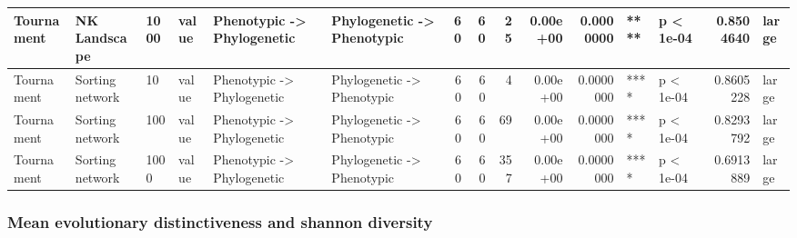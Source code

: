 \documentclass[]{book}
\begin{document}
\begin{table}
\begin{tabular}[t]{l|l|l|l|l|l|r|r|r|r|r|l|l|r|l}
\hline
Tournament & NK Landscape & 1000 & value & Phenotypic
    ->
Phylogenetic & Phylogenetic
    ->
Phenotypic & 60 & 60 & 25 & 0.00e+00 & 0.0000000 & **** & p < 1e-04 & 0.8504640 & large\\
\hline
Tournament & Sorting network & 10 & value & Phenotypic
    ->
Phylogenetic & Phylogenetic
    ->
Phenotypic & 60 & 60 & 4 & 0.00e+00 & 0.0000000 & **** & p < 1e-04 & 0.8605228 & large\\
\hline
Tournament & Sorting network & 100 & value & Phenotypic
    ->
Phylogenetic & Phylogenetic
    ->
Phenotypic & 60 & 60 & 69 & 0.00e+00 & 0.0000000 & **** & p < 1e-04 & 0.8293792 & large\\
\hline
Tournament & Sorting network & 1000 & value & Phenotypic
    ->
Phylogenetic & Phylogenetic
    ->
Phenotypic & 60 & 60 & 357 & 0.00e+00 & 0.0000000 & **** & p < 1e-04 & 0.6913889 & large\\
\hline
\end{tabular}
\end{table}

\hypertarget{mean-evolutionary-distinctiveness-and-shannon-diversity-1}{%
\subsubsection{Mean evolutionary distinctiveness and shannon diversity}\label{mean-evolutionary-distinctiveness-and-shannon-diversity-1}}
\end{document}
